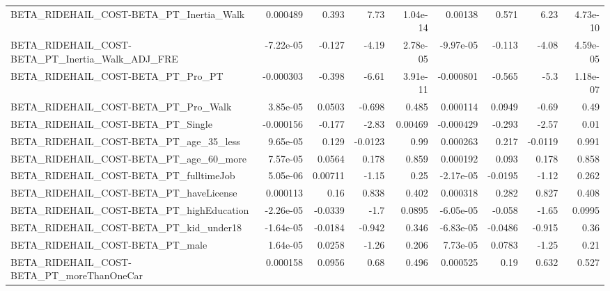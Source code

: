 \begin{tabular}{lrrrrrrrr}
BETA\_RIDEHAIL\_COST-BETA\_PT\_Inertia\_Walk            &    0.000489 &        0.393 &     7.73 & 1.04e-14 &    0.00138 &       0.571 &         6.23 &      4.73e-10 \\
BETA\_RIDEHAIL\_COST-BETA\_PT\_Inertia\_Walk\_ADJ\_FRE    &   -7.22e-05 &       -0.127 &    -4.19 & 2.78e-05 &  -9.97e-05 &      -0.113 &        -4.08 &      4.59e-05 \\
BETA\_RIDEHAIL\_COST-BETA\_PT\_Pro\_PT                  &   -0.000303 &       -0.398 &    -6.61 & 3.91e-11 &  -0.000801 &      -0.565 &         -5.3 &      1.18e-07 \\
BETA\_RIDEHAIL\_COST-BETA\_PT\_Pro\_Walk                &    3.85e-05 &       0.0503 &   -0.698 &    0.485 &   0.000114 &      0.0949 &        -0.69 &          0.49 \\
BETA\_RIDEHAIL\_COST-BETA\_PT\_Single                  &   -0.000156 &       -0.177 &    -2.83 &  0.00469 &  -0.000429 &      -0.293 &        -2.57 &          0.01 \\
BETA\_RIDEHAIL\_COST-BETA\_PT\_age\_35\_less             &    9.65e-05 &        0.129 &  -0.0123 &     0.99 &   0.000263 &       0.217 &      -0.0119 &         0.991 \\
BETA\_RIDEHAIL\_COST-BETA\_PT\_age\_60\_more             &    7.57e-05 &       0.0564 &    0.178 &    0.859 &   0.000192 &       0.093 &        0.178 &         0.858 \\
BETA\_RIDEHAIL\_COST-BETA\_PT\_fulltimeJob             &    5.05e-06 &      0.00711 &    -1.15 &     0.25 &  -2.17e-05 &     -0.0195 &        -1.12 &         0.262 \\
BETA\_RIDEHAIL\_COST-BETA\_PT\_haveLicense             &    0.000113 &         0.16 &    0.838 &    0.402 &   0.000318 &       0.282 &        0.827 &         0.408 \\
BETA\_RIDEHAIL\_COST-BETA\_PT\_highEducation           &   -2.26e-05 &      -0.0339 &     -1.7 &   0.0895 &  -6.05e-05 &      -0.058 &        -1.65 &        0.0995 \\
BETA\_RIDEHAIL\_COST-BETA\_PT\_kid\_under18             &   -1.64e-05 &      -0.0184 &   -0.942 &    0.346 &  -6.83e-05 &     -0.0486 &       -0.915 &          0.36 \\
BETA\_RIDEHAIL\_COST-BETA\_PT\_male                    &    1.64e-05 &       0.0258 &    -1.26 &    0.206 &   7.73e-05 &      0.0783 &        -1.25 &          0.21 \\
BETA\_RIDEHAIL\_COST-BETA\_PT\_moreThanOneCar          &    0.000158 &       0.0956 &     0.68 &    0.496 &   0.000525 &        0.19 &        0.632 &         0.527 \\

\end{tabular}
